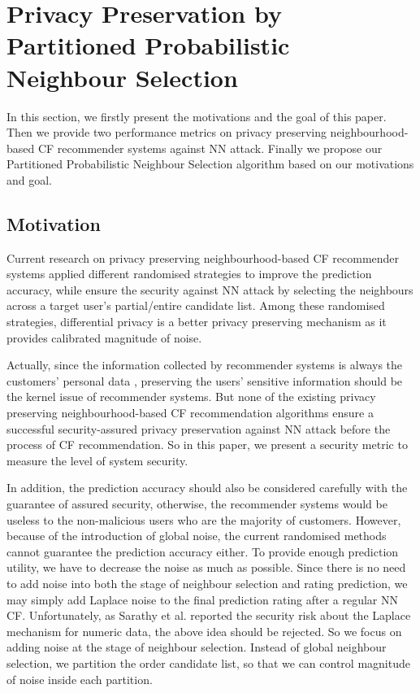 \documentclass[11pt]{article}
\begin{document}
\section{Privacy Preservation by Partitioned Probabilistic Neighbour Selection}
\label{SCH}
In this section, we firstly present the motivations and the goal of this paper. Then we provide two performance metrics on privacy preserving neighbourhood-based CF recommender systems against NN attack. Finally we propose our Partitioned Probabilistic Neighbour Selection algorithm based on our motivations and goal.

\subsection{Motivation}
Current research \cite{MCSHERRY2009,ZHU2014,ADAMOPOULOS2014} on privacy preserving neighbourhood-based CF recommender systems applied different randomised strategies to improve the prediction accuracy, while ensure the security against NN attack by selecting the  neighbours across a target user's partial/entire candidate list. Among these randomised strategies, differential privacy is a better privacy preserving mechanism as it provides calibrated magnitude of noise.

Actually, since the information collected by recommender systems is always the customers' personal data \cite{CALANDRINO2011}, preserving the users' sensitive information should be the kernel issue of recommender systems. But none of the existing privacy preserving neighbourhood-based CF recommendation algorithms ensure a successful security-assured privacy preservation against NN attack before the process of CF recommendation. So in this paper, we present a security metric to measure the level of system security.

In addition, the prediction accuracy should also be considered carefully with the guarantee of assured security, otherwise, the recommender systems would be useless to the non-malicious users who are the majority of customers. However, because of the introduction of global noise, the current randomised methods cannot guarantee the prediction accuracy either. To provide enough prediction utility, we have to decrease the noise as much as possible. Since there is no need to add noise into both the stage of neighbour selection and rating prediction, we may simply add Laplace noise \cite{DWORK2006} to the final prediction rating after a regular NN CF. Unfortunately, as Sarathy et al. \cite{SARATHY2011} reported the security risk about the Laplace mechanism for numeric data, the above idea should be rejected. So we focus on adding noise at the stage of neighbour selection. Instead of global neighbour selection, we partition the order candidate list, so that we can control magnitude of noise inside each partition.
\end{document}
